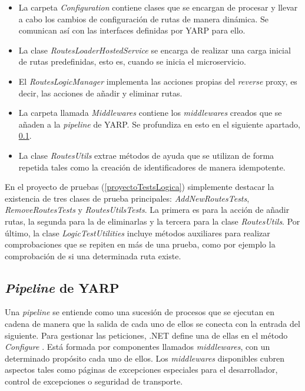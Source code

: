 \documentclass[11pt,spanish,listoffigures]{tfgetsinf}
\begin{document}
\begin{itemize}

	\item La carpeta \emph{Configuration} contiene clases que se encargan de procesar y llevar a cabo los cambios de configuración de rutas de manera dinámica. Se comunican así con las interfaces definidas por YARP para ello.

	\item La clase \emph{RoutesLoaderHostedService} se encarga de realizar una carga inicial de rutas predefinidas, esto es, cuando se inicia el microservicio.

	\item El \emph{RoutesLogicManager} implementa las acciones propias del \emph{reverse} proxy, es decir, las acciones de añadir y eliminar rutas.

	\item La carpeta llamada \emph{Middlewares} contiene los \emph{middlewares} creados que se añaden a la \emph{pipeline} de YARP. Se profundiza en esto en el siguiente apartado, \ref{pipelineYARP}.

	\item La clase \emph{RoutesUtils} extrae métodos de ayuda que se utilizan de forma repetida tales como la creación de identificadores de manera idempotente.

\end{itemize}

En el proyecto de pruebas (\ref{proyectoTestsLogica}) simplemente destacar la existencia de tres clases de prueba principales: \emph{AddNewRoutesTests}, \emph{RemoveRoutesTests} y \emph{RoutesUtilsTests}. La primera es para la acción de añadir rutas, la segunda para la de eliminarlas y la tercera para la clase \emph{RoutesUtils}. Por último, la clase \emph{LogicTestUtilities} incluye métodos auxiliares para realizar comprobaciones que se repiten en más de una prueba, como por ejemplo la comprobación de si una determinada ruta existe.


		\subsection{\emph{Pipeline} de YARP} \label{pipelineYARP}

Una \emph{pipeline} se entiende como una sucesión de procesos que se ejecutan en cadena de manera que la salida de cada uno de ellos se conecta con la entrada del siguiente. Para gestionar las peticiones, .NET define una de ellas en el método \emph{Configure} \cite{MiddlewaresPipeline}. Está formada por componentes llamados \emph{middlewares}, con un determinado propósito cada uno de ellos. Los \emph{middlewares} disponibles cubren aspectos tales como páginas de excepciones especiales para el desarrollador, control de excepciones o seguridad de transporte.
\end{document}
